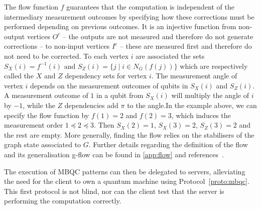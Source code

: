 \documentclass[12pt]{iopart}
\renewcommand{\1}{\mathds{1}}
\begin{document}
The flow function $f$ guarantees that the computation is independent of the intermediary measurement outcomes by specifying how these corrections must be performed depending on previous outcomes. It is an injective function from non-output vertices $O^c$ -- the outputs are not measured and therefore do not generate corrections -- to non-input vertices $I^c$ -- these are measured first and therefore do not need to be corrected. To each vertex $i$ are associated the sets $S_X(i) = f^{-1}(i)$ and $S_Z(i) = \{j \mid i \in N_G(f(j))\}$ which are respectively called the $X$ and $Z$ dependency sets for vertex $i$. The measurement angle of vertex $i$ depends on the measurement outcomes of qubits in $S_X(i)$ and $S_Z(i)$. A measurement outcome of $1$ in a qubit from $S_X(i)$ will multiply the angle of $i$ by $-1$, while the $Z$ dependencies add $\pi$ to the angle.In the example above, we can specify the flow function by $f(1) = 2$ and $f(2) = 3$, which induces the measurement order $1 \preceq 2 \preceq 3$. Then $S_X(2) = 1$, $S_X(3) = 2$, $S_Z(3) = 2$ and the rest are empty. More generally, finding the flow relies on the stabilisers of the graph state associated to $G$.
Further details regarding the definition of the flow and its generalisation g-flow can be found in \ref{app:flow} and references~\cite{HEB04:multiparty,DK06:determinism}.

The execution of MBQC patterns can then be delegated to servers, alleviating the need for the client to own a quantum machine using Protocol~\ref{proto:mbqc}. This first protocol is not blind, nor can the client test that the server is performing the computation correctly.
\end{document}
